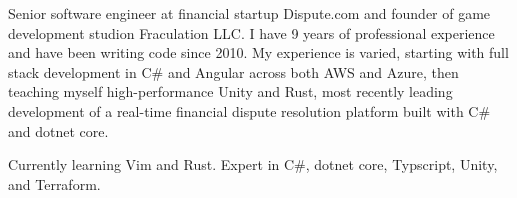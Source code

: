 

\begin{cvparagraph}

Senior software engineer at financial startup Dispute.com and founder of game development studion Fraculation LLC.\@
I have 9 years of professional experience and have been writing code since 2010. My experience is varied, starting with 
full stack development in C\# and Angular across both AWS and Azure, then teaching myself high-performance Unity and Rust,
most recently leading development of a real-time financial dispute resolution platform built with C\# and dotnet core.

Currently learning Vim and Rust. Expert in C\#, dotnet core, Typscript, Unity, and Terraform.

\end{cvparagraph}
